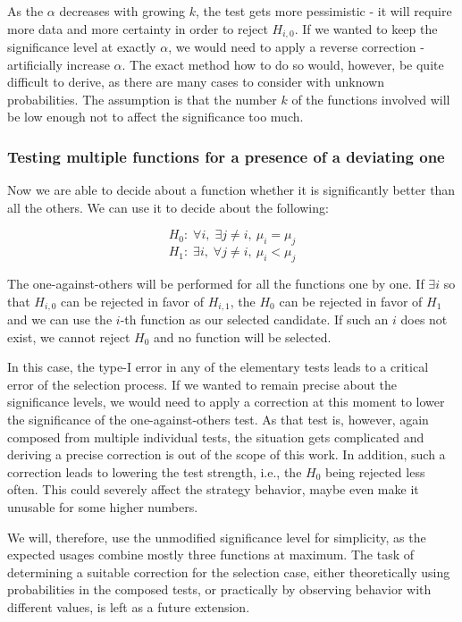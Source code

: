 As the $\alpha$ decreases with growing $k$, the test gets more pessimistic - it will require more data and more certainty in order to reject $H_{i,0}$. If we wanted to keep the significance level at exactly $\alpha$, we would need to apply a reverse correction - artificially increase $\alpha$. The exact method how to do so would, however, be quite difficult to derive, as there are many cases to consider with unknown probabilities. The assumption is that the number $k$ of the functions involved will be low enough not to affect the significance too much. 

\subsubsection{Testing multiple functions for a presence of a deviating one}

Now we are able to decide about a function whether it is significantly better than all the others. We can use it to decide about the following:

\[
H_0: \; \forall i,\; \exists j \neq i, \ \mu_i = \mu_j
\]
\[
H_1: \; \exists i,\; \forall j \neq i, \ \mu_i < \mu_j
\]

The one-against-others will be performed for all the functions one by one. If $\exists i$ so that $H_{i,0}$ can be rejected in favor of $H_{i, 1}$, the $H_0$ can be rejected in favor of $H_1$ and we can use the $i$-th function as our selected candidate. If such an $i$ does not exist, we cannot reject $H_0$ and no function will be selected.

 In this case, the type-I error in any of the elementary tests leads to a critical error of the selection process. If we wanted to remain precise about the significance levels, we would need to apply a correction at this moment to lower the significance of the one-against-others test. As that test is, however, again composed from multiple individual tests, the situation gets complicated and deriving a precise correction is out of the scope of this work. In addition, such a correction leads to lowering the test strength, i.e., the $H_0$ being rejected less often. This could severely affect the strategy behavior, maybe even make it unusable for some higher numbers.
 
 We will, therefore, use the unmodified significance level for simplicity, as the expected usages combine mostly three functions at maximum. The task of determining a suitable correction for the selection case, either theoretically using probabilities in the composed tests, or practically by observing behavior with different values, is left as a future extension.

